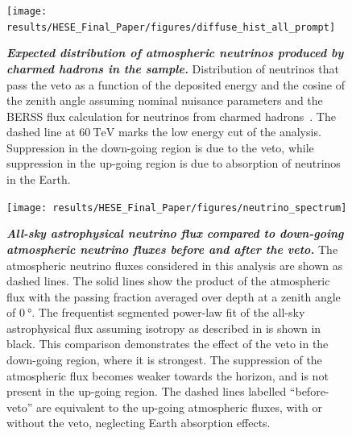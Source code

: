 \begin{figure}
	\centering
	\texttt{[image: results/HESE\_Final\_Paper/figures/diffuse\_hist\_all\_prompt]}
	\internallinenumbers
	\caption{\textbf{\textit{Expected distribution of atmospheric neutrinos produced by charmed hadrons in the sample.}} Distribution of neutrinos that pass the veto as a function of the deposited energy and the cosine of the zenith angle assuming nominal nuisance parameters and the BERSS flux calculation for neutrinos from  charmed hadrons~\cite{Bhattacharya:2015jpa}.
		The dashed line at $\SI{60}\TeV$ marks the low energy cut of the analysis.
		Suppression in the down-going region is due to the veto, while suppression in the up-going region is due to absorption of neutrinos in the Earth.}\label{fig:prompt_distribution}
\end{figure}

\begin{figure}
	\centering
	\texttt{[image: results/HESE\_Final\_Paper/figures/neutrino\_spectrum]}
	\internallinenumbers
	\caption{\textbf{\textit{All-sky astrophysical neutrino flux compared to down-going atmospheric neutrino fluxes before and after the veto.}}
		The atmospheric neutrino fluxes considered in this analysis are shown as dashed lines.
		The solid lines show the product of the atmospheric flux with the passing fraction averaged over depth at a zenith angle of $\SI{0}\degree$.
		The frequentist segmented power-law fit of the all-sky astrophysical flux assuming isotropy as described in  is shown in black.
		This comparison demonstrates the effect of the veto in the down-going region, where it is strongest.
		The suppression of the atmospheric flux becomes weaker towards the horizon, and is not present in the up-going region.
		The dashed lines labelled ``before-veto'' are equivalent to the up-going atmospheric fluxes, with or without the veto, neglecting Earth absorption effects.}
	\label{fig:neutrino_spectrum}
\end{figure}

